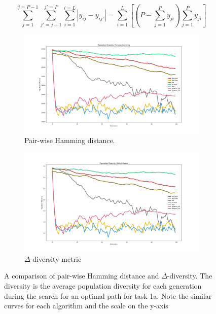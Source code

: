 \begin{equation}
    \label{eq:linearHamming}
    \sum_{j=1}^{j=P-1}\sum_{{j}'=j+1}^{{j}'=P}\sum_{i=1}^{i=L}\left |y_{ij}-y_{i{j}'}\right | = \sum_{i=1}^{L}\left [ \left (  P-\sum_{j=1}^{P}y_{ji} \right )\sum_{j=1}^{P}y_{ji} \right ]
\end{equation}

\begin{figure}
    \label{fig:diversity_comparison}
    \begin{subfigure}[h]{0.49\linewidth}
        \label{fig:diversity_comparison:Hamming}
        \includegraphics[width=\linewidth]{Chapters/Experiments/search_algo/figures/diversity_showcase_hamming.png}
        \caption{Pair-wise Hamming distance.}
    \end{subfigure}
    \hfill
    \begin{subfigure}[h]{0.49\linewidth}
        \label{fig:diversity_comparison:homemade}
        \includegraphics[width=\linewidth]{Chapters/Experiments/search_algo/figures/diversity_showcase_homemade.png}
        \caption{\(\Delta\)-diversity metric}
    \end{subfigure}%
    \caption{A comparison of pair-wise Hamming distance and \(\Delta\)-diversity. The diversity is the average population diversity for each generation during the search for an optimal path for task 1a. Note the similar curves for each algorithm and the scale on the y-axis}
\end{figure}
